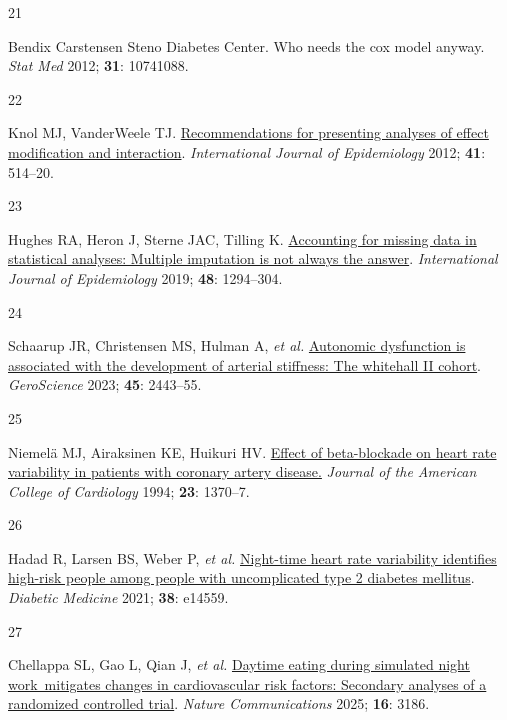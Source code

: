 \documentclass[
  a4paper,
  headsepline=true,
  open=any]{scrbook}
\newlength{\cslhangindent}
\newlength{\csllabelwidth}
\newlength{\cslentryspacingunit} %
\newenvironment{CSLReferences}[2] %
 {%
  \setlength{\parindent}{0pt}
  \ifodd #1
  \let\oldpar\par
  \def\par{\hangindent=\cslhangindent\oldpar}
  \fi
  \setlength{\parskip}{#2\cslentryspacingunit}
 }%
 {}
\newcommand{\CSLLeftMargin}[1]{\parbox[t]{\csllabelwidth}{#1}}
\newcommand{\CSLRightInline}[1]{\parbox[t]{\linewidth - \csllabelwidth}{#1}\break}
\begin{document}
\begin{CSLReferences}{0}{0}
\leavevmode{}%
\CSLLeftMargin{21 }%
\CSLRightInline{Bendix Carstensen Steno Diabetes Center. Who needs the
cox model anyway. \emph{Stat Med} 2012; \textbf{31}: 10741088.}

\leavevmode{}%
\CSLLeftMargin{22 }%
\CSLRightInline{Knol MJ, VanderWeele TJ.
\href{https://doi.org/10.1093/ije/dyr218}{Recommendations for presenting
analyses of effect modification and interaction}. \emph{International
Journal of Epidemiology} 2012; \textbf{41}: 514--20.}

\leavevmode{}%
\CSLLeftMargin{23 }%
\CSLRightInline{Hughes RA, Heron J, Sterne JAC, Tilling K.
\href{https://doi.org/10.1093/ije/dyz032}{Accounting for missing data in
statistical analyses: Multiple imputation is not always the answer}.
\emph{International Journal of Epidemiology} 2019; \textbf{48}:
1294--304.}

\leavevmode{}%
\CSLLeftMargin{24 }%
\CSLRightInline{Schaarup JR, Christensen MS, Hulman A, \emph{et al.}
\href{https://doi.org/10.1007/s11357-023-00762-0}{Autonomic dysfunction
is associated with the development of arterial stiffness: The whitehall
II cohort}. \emph{GeroScience} 2023; \textbf{45}: 2443--55.}

\leavevmode{}%
\CSLLeftMargin{25 }%
\CSLRightInline{Niemelä MJ, Airaksinen KE, Huikuri HV.
\href{https://doi.org/10.1016/0735-1097(94)90379-4}{Effect of
beta-blockade on heart rate variability in patients with coronary artery
disease.} \emph{Journal of the American College of Cardiology} 1994;
\textbf{23}: 1370--7.}

\leavevmode{}%
\CSLLeftMargin{26 }%
\CSLRightInline{Hadad R, Larsen BS, Weber P, \emph{et al.}
\href{https://doi.org/10.1111/dme.14559}{Night-time heart rate
variability identifies high-risk people among people with uncomplicated
type 2 diabetes mellitus}. \emph{Diabetic Medicine} 2021; \textbf{38}:
e14559.}

\leavevmode{}%
\CSLLeftMargin{27 }%
\CSLRightInline{Chellappa SL, Gao L, Qian J, \emph{et al.}
\href{https://doi.org/10.1038/s41467-025-57846-y}{Daytime eating during
simulated night work~mitigates changes in cardiovascular risk factors:
Secondary analyses of a randomized controlled trial}. \emph{Nature
Communications} 2025; \textbf{16}: 3186.}


\end{CSLReferences}
\end{document}
